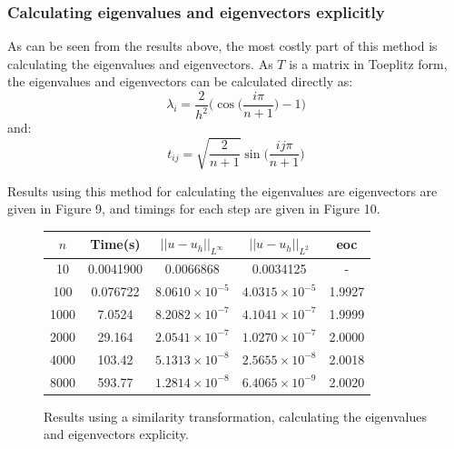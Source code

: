 \documentclass{article}
\numberwithin{equation}{section}
\begin{document}
\subsubsection*{Calculating eigenvalues and eigenvectors explicitly}

As can be seen from the results above, the most costly part of this method is calculating the eigenvalues and eigenvectors. As $T$ is a matrix in Toeplitz form, the eigenvalues and eigenvectors can be calculated directly as:
\[ \lambda_i = \frac{2}{h^2} \Big( \cos \Big( \frac{i \pi}{n+1} \Big) - 1 \Big) \]
and:
\[ t_{ij} = \sqrt{\frac{2}{n+1}} \sin \Big( \frac{ij \pi}{n+1}  \Big) \]

Results using this method for calculating the eigenvalues are eigenvectors are given in Figure 9, and timings for each step are given in Figure 10.

\begin{figure}[H]
\centering
\begin{tabular}{|c|c|c|c|c|}
\hline
$n$ & Time(s) & $|| u - u_h ||_{L^{\infty}}$ &$|| u - u_h ||_{L^{2}}$ & eoc \\
\hline
10 & 0.0041900 & 0.0066868 & 0.0034125 & - \\
100 & 0.076722 & $8.0610 \times 10^{-5}$ & $4.0315 \times 10^{-5}$ & 1.9927 \\
1000 & 7.0524 & $8.2082 \times 10^{-7}$ & $4.1041 \times 10^{-7}$ & 1.9999 \\
2000 & 29.164 & $2.0541 \times 10^{-7}$ & $1.0270 \times 10^{-7}$ & 2.0000 \\
4000 & 103.42 & $5.1313 \times 10^{-8}$ & $2.5655 \times 10^{-8}$ & 2.0018 \\
8000 & 593.77 & $1.2814 \times 10^{-8}$ & $6.4065 \times 10^{-9}$ & 2.0020 \\
\hline
\end{tabular}
\captionsetup{justification=centering}
\caption{Results using a similarity transformation, calculating the eigenvalues and eigenvectors explicity.}
\end{figure}
\end{document}
